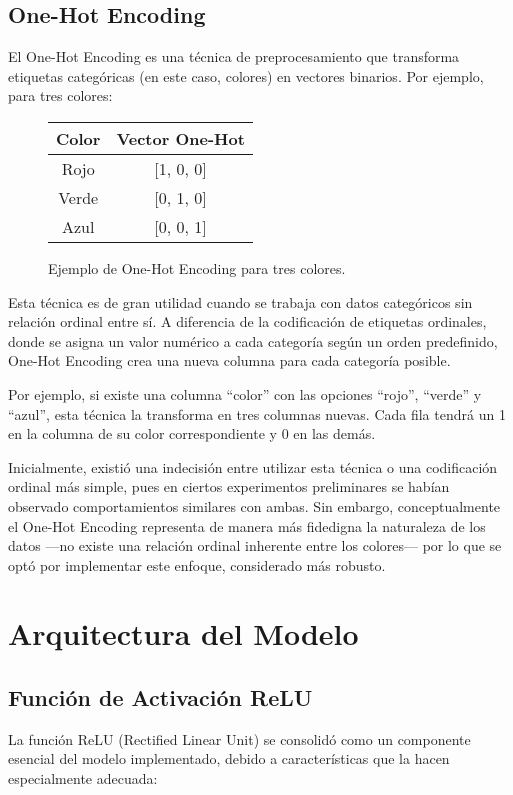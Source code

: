 \subsection{One-Hot Encoding}
El One-Hot Encoding \cite{raschka2022machine} es una técnica de preprocesamiento que transforma etiquetas categóricas (en este caso, colores) en vectores binarios. Por ejemplo, para tres colores:

\begin{figure}[h!]
    \centering
    \begin{tabular}{c|c}
        Color & Vector One-Hot \\
        \hline
        Rojo & [1, 0, 0] \\
        Verde & [0, 1, 0] \\
        Azul & [0, 0, 1]
    \end{tabular}
    \caption{Ejemplo de One-Hot Encoding para tres colores.}
    \label{fig:one_hot_encoding}
\end{figure}

Esta técnica es de gran utilidad cuando se trabaja con datos categóricos sin relación ordinal entre sí. A diferencia de la codificación de etiquetas ordinales, donde se asigna un valor numérico a cada categoría según un orden predefinido, One-Hot Encoding crea una nueva columna para cada categoría posible.

Por ejemplo, si existe una columna \textquotedblleft color\textquotedblright{} con las opciones \textquotedblleft rojo\textquotedblright{}, \textquotedblleft verde\textquotedblright{} y \textquotedblleft azul\textquotedblright{}, esta técnica la transforma en tres columnas nuevas. Cada fila tendrá un 1 en la columna de su color correspondiente y 0 en las demás.

Inicialmente, existió una indecisión entre utilizar esta técnica o una codificación ordinal más simple, pues en ciertos experimentos preliminares se habían observado comportamientos similares con ambas. Sin embargo, conceptualmente el One-Hot Encoding representa de manera más fidedigna la naturaleza de los datos —no existe una relación ordinal inherente entre los colores— por lo que se optó por implementar este enfoque, considerado más robusto.

\section{Arquitectura del Modelo}

\subsection{Función de Activación ReLU}
La función ReLU (Rectified Linear Unit) se consolidó como un componente esencial del modelo implementado, debido a características que la hacen especialmente adecuada:

